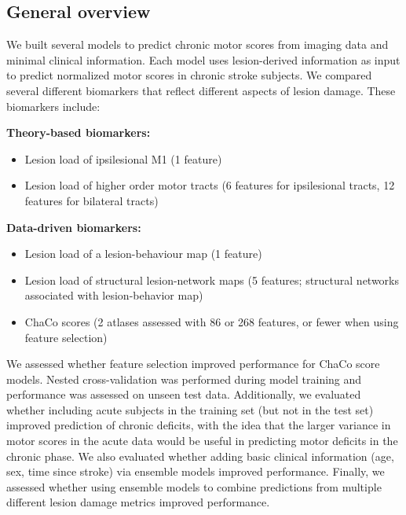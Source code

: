 \documentclass[10pt]{article}
\begin{document}
\subsection{General overview}

We built several models to predict chronic motor scores from imaging data and minimal clinical information. Each model uses lesion-derived information as input to predict normalized motor scores in chronic stroke subjects. We compared several different biomarkers that reflect different aspects of lesion damage. These biomarkers include:


\textbf{Theory-based biomarkers:}
\begin{itemize}
\item Lesion load of ipsilesional M1 (1 feature)
\item Lesion load of higher order motor tracts (6 features for ipsilesional tracts, 12 features for bilateral tracts)
\end{itemize}

\textbf{Data-driven biomarkers:}
\begin{itemize}
\item Lesion load of a lesion-behaviour map (1 feature)
\item Lesion load of structural lesion-network maps (5 features; structural networks associated with lesion-behavior map)
\item ChaCo scores (2 atlases assessed with 86 or 268 features, or fewer when using feature selection)
\end{itemize}

We assessed whether feature selection improved performance for ChaCo score models. Nested cross-validation was performed during model training and performance was assessed on unseen test data.  Additionally, we evaluated whether including acute subjects in the training set (but not in the test set) improved prediction of chronic deficits, with the idea that the larger variance in motor scores in the acute data would be useful in predicting motor deficits in the chronic phase. We also evaluated whether adding basic clinical information (age, sex, time since stroke) via ensemble models improved performance. Finally, we assessed whether using ensemble models to combine predictions from multiple different lesion damage metrics improved performance.
\end{document}
